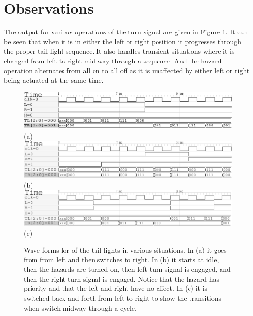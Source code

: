 \documentclass[12pt]{article}
\begin{document}


\section{Observations}

The output for various operations of the turn signal are given
in Figure \ref{fig:waves}.
It can be seen that when it is in either the left or right
position it progresses through the proper tail light sequence.
It also handles transient situations where it is changed from
left to right mid way through a sequence.
And the hazard operation alternates from all on to all off
as it is unaffected by either left or right being actuated at the same time.

\begin{figure}
\center
\includegraphics[scale=0.7]{figures/left-right-wave} \\
(a) \\
\includegraphics[scale=0.7]{figures/hazard-wave} \\
(b) \\
\includegraphics[scale=0.7]{figures/left-right-random-wave} \\
(c)
\caption{Wave forms for of the tail lights in various situations.
In (a) it goes from from left and then switches to right.
In (b) it starts at idle, then the hazards are turned on, then
left turn signal is engaged, and then the right turn signal is engaged.
Notice that the hazard has priority and that the left and right have no effect.
In (c) it is switched back and forth from left to right to show the transitions
when switch midway through a cycle.
}
\label{fig:waves}
\end{figure}
\end{document}
